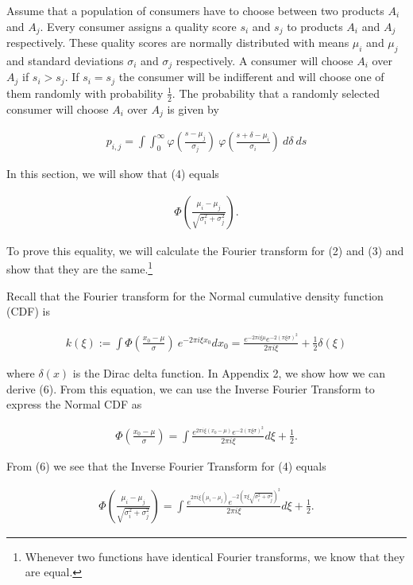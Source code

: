 \documentclass[]{article}
\begin{document}
Assume that a population of consumers have to choose between two
products \(A_i\) and \(A_j\). Every consumer assigns a quality score
\(s_i\) and \(s_j\) to products \(A_i\) and \(A_j\) respectively. These
quality scores are normally distributed with means \(\mu_i\) and
\(\mu_j\) and standard deviations \(\sigma_i\) and \(\sigma_j\)
respectively. A consumer will choose \(A_i\) over \(A_j\) if
\(s_i > s_j\). If \(s_i = s_j\) the consumer will be indifferent and
will choose one of them randomly with probability \(\frac{1}{2}\). The
probability that a randomly selected consumer will choose \(A_i\) over
\(A_j\) is given by

\begin{align}
p_{i,j} = \int \int_0^{\infty} \varphi(\frac{s - \mu_j}{\sigma_j})\ \varphi (\frac{s + \delta - \mu_i}{\sigma_i})\ d\delta\ ds
\end{align}

In this section, we will show that (4) equals

\begin{align}
\Phi (\frac{\mu_i - \mu_j}{\sqrt{\sigma_i^2 + \sigma_j^2}}).
\end{align}

To prove this equality, we will calculate the Fourier transform for (2)
and (3) and show that they are the same.\footnote{Whenever two functions
  have identical Fourier transforms, we know that they are equal. }

Recall that the Fourier transform for the Normal cumulative density
function (CDF) is

\begin{align}
k(\xi) := \int \Phi (\frac{x_0 - \mu}{\sigma})\ e^{-2 \pi i \xi x_0} d x_0 = \frac{e^{-2 \pi i \xi \mu} e^{-2(\pi \xi \sigma)^2}}{2 \pi i \xi} + \frac{1}{2}\delta(\xi)
\end{align}

where \(\delta (x)\) is the Dirac delta function. In Appendix 2, we show
how we can derive (6). From this equation, we can use the Inverse
Fourier Transform to express the Normal CDF as

\begin{align}
\Phi (\frac{x_0 - \mu}{\sigma}) = \int \frac{e^{2 \pi i \xi (x_0 - \mu)} e^{-2(\pi \xi \sigma)^2}}{2 \pi i \xi} d \xi + \frac{1}{2}.
\end{align}

From (6) we see that the Inverse Fourier Transform for (4) equals

\begin{align}
\Phi (\frac{\mu_i - \mu_j}{\sqrt{\sigma_i^2 + \sigma_j^2}}) = \int \frac{e^{2 \pi i \xi (\mu_i - \mu_j)} e^{-2(\pi \xi \sqrt{\sigma_i^2 + \sigma_j^2})^2}}{2 \pi i \xi} d \xi + \frac{1}{2}.
\end{align}
\end{document}
